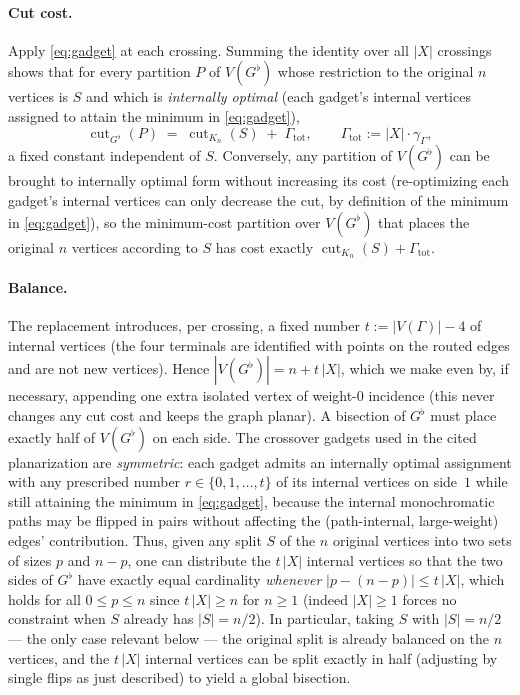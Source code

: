 \documentclass{amsart}
\theoremstyle{plain}
\theoremstyle{definition}
\theoremstyle{remark}
\newcommand{\cut}{\operatorname{cut}}
\begin{document}
\paragraph{Cut cost.}
Apply \eqref{eq:gadget} at each crossing. Summing the identity over all $|X|$ crossings
shows that for every partition $P$ of $V(G^{\flat})$ whose restriction to the original
$n$ vertices is $S$ and which is \emph{internally optimal} (each gadget's internal
vertices assigned to attain the minimum in \eqref{eq:gadget}),
\begin{equation}\label{eq:global}
  \cut_{G^{\flat}}(P) \;=\; \cut_{K_n}(S)\;+\;\Gamma_{\mathrm{tot}},
  \qquad \Gamma_{\mathrm{tot}}:=|X|\cdot\gamma_\Gamma,
\end{equation}
a fixed constant independent of $S$. Conversely, any partition of $V(G^{\flat})$ can be
brought to internally optimal form without increasing its cost (re-optimizing each
gadget's internal vertices can only decrease the cut, by definition of the minimum in
\eqref{eq:gadget}), so the minimum-cost partition over $V(G^{\flat})$ that places the
original $n$ vertices according to $S$ has cost exactly $\cut_{K_n}(S)+\Gamma_{\mathrm{tot}}$.

\paragraph{Balance.}
The replacement introduces, per crossing, a fixed number $t:=|V(\Gamma)|-4$ of internal
vertices (the four terminals are identified with points on the routed edges and are not
new vertices). Hence $|V(G^{\flat})| = n + t\,|X|$, which we make even by, if necessary,
appending one extra isolated vertex of weight-$0$ incidence (this never changes any cut
cost and keeps the graph planar). A bisection of $G^{\flat}$ must place exactly half of
$V(G^{\flat})$ on each side. The crossover gadgets used in the cited planarization are
\emph{symmetric}: each gadget admits an internally optimal assignment with any prescribed
number $r\in\{0,1,\dots,t\}$ of its internal vertices on side~$1$ while still attaining
the minimum in \eqref{eq:gadget}, because the internal monochromatic paths may be flipped
in pairs without affecting the (path-internal, large-weight) edges' contribution. Thus,
given any split $S$ of the $n$ original vertices into two sets of sizes $p$ and $n-p$, one
can distribute the $t\,|X|$ internal vertices so that the two sides of $G^{\flat}$ have
exactly equal cardinality \emph{whenever} $|p-(n-p)|\le t\,|X|$, which holds for all
$0\le p\le n$ since $t\,|X|\ge n$ for $n\ge 1$ (indeed $|X|\ge 1$ forces no constraint
when $S$ already has $|S|=n/2$). In particular, taking $S$ with $|S|=n/2$ — the only case
relevant below — the original split is already balanced on the $n$ vertices, and the
$t\,|X|$ internal vertices can be split exactly in half (adjusting by single flips as just
described) to yield a global bisection.
\end{document}
